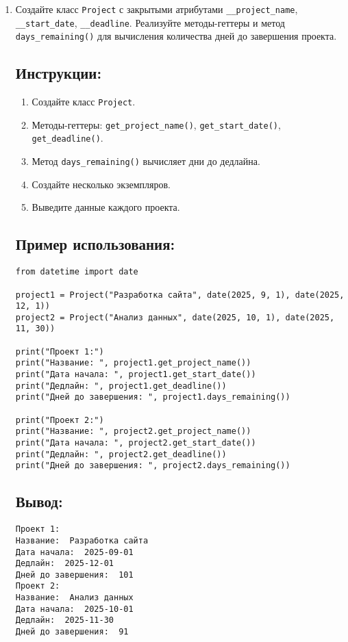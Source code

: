 \begin{enumerate}
\item
Создайте класс \texttt{Project} с закрытыми атрибутами \texttt{\_\_project\_name}, \texttt{\_\_start\_date}, \texttt{\_\_deadline}. Реализуйте методы-геттеры и метод \texttt{days\_remaining()} для вычисления количества дней до завершения проекта.

\subsection*{Инструкции:}
\begin{enumerate}
    \item Создайте класс \texttt{Project}.
    \item Методы-геттеры: \texttt{get\_project\_name()}, \texttt{get\_start\_date()}, \texttt{get\_deadline()}.
    \item Метод \texttt{days\_remaining()} вычисляет дни до дедлайна.
    \item Создайте несколько экземпляров.
    \item Выведите данные каждого проекта.
\end{enumerate}

\subsection*{Пример использования:}
\begin{lstlisting}[caption=Пример кода]
from datetime import date

project1 = Project("Разработка сайта", date(2025, 9, 1), date(2025, 12, 1))
project2 = Project("Анализ данных", date(2025, 10, 1), date(2025, 11, 30))

print("Проект 1:")
print("Название: ", project1.get_project_name())
print("Дата начала: ", project1.get_start_date())
print("Дедлайн: ", project1.get_deadline())
print("Дней до завершения: ", project1.days_remaining())

print("Проект 2:")
print("Название: ", project2.get_project_name())
print("Дата начала: ", project2.get_start_date())
print("Дедлайн: ", project2.get_deadline())
print("Дней до завершения: ", project2.days_remaining())
\end{lstlisting}

\subsection*{Вывод:}
\begin{lstlisting}[caption=Ожидаемый вывод]
Проект 1:
Название:  Разработка сайта
Дата начала:  2025-09-01
Дедлайн:  2025-12-01
Дней до завершения:  101
Проект 2:
Название:  Анализ данных
Дата начала:  2025-10-01
Дедлайн:  2025-11-30
Дней до завершения:  91
\end{lstlisting}


\end{enumerate}
